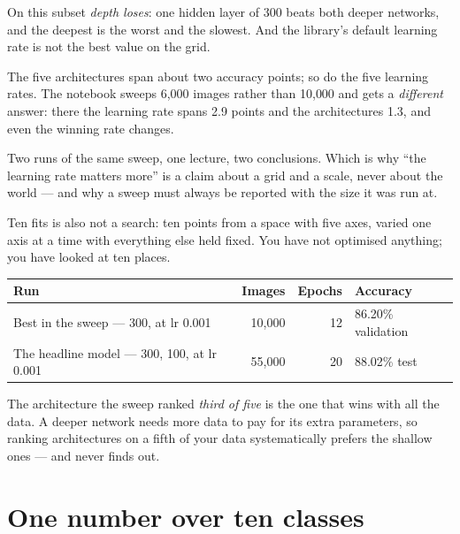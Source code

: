 \documentclass[11pt,a4paper]{article}
\begin{document}
On this subset \emph{depth loses}: one hidden layer of 300 beats both deeper
networks, and the deepest is the worst and the slowest. And the library's
default learning rate is not the best value on the grid.

\begin{failbox}[title={Failure condition --- a sweep whose winner depends on the scale it was run at}]
The five architectures span about two accuracy points; so do the five learning
rates. The notebook sweeps 6{,}000 images rather than 10{,}000 and gets a
\emph{different} answer: there the learning rate spans 2.9 points and the
architectures 1.3, and even the winning rate changes.

Two runs of the same sweep, one lecture, two conclusions. Which is why ``the
learning rate matters more'' is a claim about a grid and a scale, never about
the world --- and why a sweep must always be reported with the size it was run
at.
\end{failbox}

Ten fits is also not a search: ten points from a space with five axes, varied
one axis at a time with everything else held fixed. You have not optimised
anything; you have looked at ten places.

\begin{keybox}[title={And the ranking does not transfer}]
\begin{center}
\small
\begin{tabular}{lrrl}
\toprule
\textbf{Run} & \textbf{Images} & \textbf{Epochs} & \textbf{Accuracy} \\
\midrule
Best in the sweep --- 300, at lr 0.001 & 10{,}000 & 12 & 86.20\% validation \\
The headline model --- 300, 100, at lr 0.001 & 55{,}000 & 20 & 88.02\% test \\
\bottomrule
\end{tabular}
\end{center}

The architecture the sweep ranked \emph{third of five} is the one that wins
with all the data. A deeper network needs more data to pay for its extra
parameters, so ranking architectures on a fifth of your data systematically
prefers the shallow ones --- and never finds out.
\end{keybox}

\section{One number over ten classes}
\end{document}
